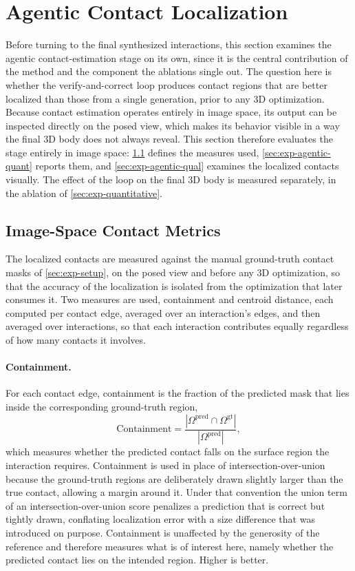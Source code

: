 \section{Agentic Contact Localization}
\label{sec:exp-agentic-qualitative}

Before turning to the final synthesized interactions, this section examines the agentic contact-estimation stage on its own, since it is the central contribution of the method and the component the ablations single out. The question here is whether the verify-and-correct loop produces contact regions that are better localized than those from a single generation, prior to any 3D optimization. Because contact estimation operates entirely in image space, its output can be inspected directly on the posed view, which makes its behavior visible in a way the final 3D body does not always reveal. This section therefore evaluates the stage entirely in image space: \cref{sec:exp-agentic-metrics} defines the measures used, \cref{sec:exp-agentic-quant} reports them, and \cref{sec:exp-agentic-qual} examines the localized contacts visually. The effect of the loop on the final 3D body is measured separately, in the ablation of \cref{sec:exp-quantitative}.

\subsection{Image-Space Contact Metrics}
\label{sec:exp-agentic-metrics}

The localized contacts are measured against the manual ground-truth contact masks of \cref{sec:exp-setup}, on the posed view and before any 3D optimization, so that the accuracy of the localization is isolated from the optimization that later consumes it. Two measures are used, containment and centroid distance, each computed per contact edge, averaged over an interaction's edges, and then averaged over interactions, so that each interaction contributes equally regardless of how many contacts it involves.

\paragraph{Containment.} For each contact edge, containment is the fraction of the predicted mask that lies inside the corresponding ground-truth region,
%
\begin{equation}
  \mathrm{Containment} = \frac{|\Omega^{\mathrm{pred}} \cap \Omega^{\mathrm{gt}}|}{|\Omega^{\mathrm{pred}}|},
  \label{eq:containment}
\end{equation}
%
which measures whether the predicted contact falls on the surface region the interaction requires. Containment is used in place of intersection-over-union because the ground-truth regions are deliberately drawn slightly larger than the true contact, allowing a margin around it. Under that convention the union term of an intersection-over-union score penalizes a prediction that is correct but tightly drawn, conflating localization error with a size difference that was introduced on purpose. Containment is unaffected by the generosity of the reference and therefore measures what is of interest here, namely whether the predicted contact lies on the intended region. Higher is better.

